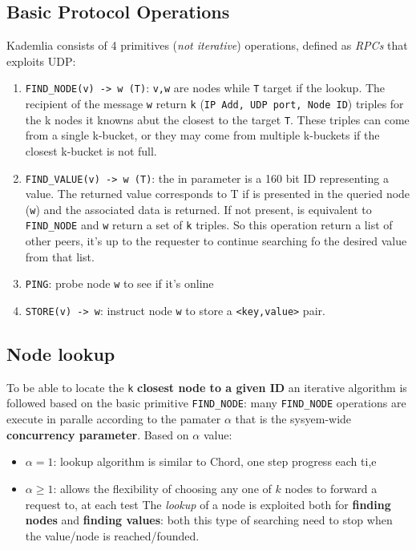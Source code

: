 \documentclass[10pt,a4paper]{report}
\begin{document}
\subsection{Basic Protocol Operations}\label{sec:basic-protocol-operations}
Kademlia consists of 4 primitives (\textit{not iterative}) operations, defined as \textit{RPCs} that exploits UDP:
\begin{enumerate}
	\item 
	\texttt{FIND\_NODE(v) -> w (T)}: \texttt{v,w} are nodes while \texttt{T} target if the lookup. The recipient of the message \texttt{w} return \texttt{k} (\texttt{IP Add, UDP port, Node ID}) triples for the k nodes it knowns abut the closest to the target \texttt{T}. These triples can come from a single k-bucket, or they may come from multiple k-buckets if the closest k-bucket is not full.
	\item 
	\texttt{FIND\_VALUE(v) -> w (T)}: the in parameter is a 160 bit ID representing a value. The returned value corresponds to T if is presented in the queried node (\texttt{w}) and the associated data is returned. If not present, is equivalent to \texttt{FIND\_NODE} and  \texttt{w} return a set of \texttt{k} triples. So this operation return a list of other peers, it's up to the requester to continue searching fo the desired value from that list.
	\item 
	\texttt{PING}: probe node \texttt{w} to see if it's online
	\item 
	\texttt{STORE(v) -> w}: instruct node \texttt{w} to store a \texttt{<key,value>} pair.
\end{enumerate}
\subsection{Node lookup}\label{sec:node-lookup}
To be able to locate the \texttt{k} \textbf{closest node to a given ID} an iterative algorithm is followed based on the basic primitive \texttt{FIND\_NODE}: many \texttt{FIND\_NODE} operations are execute in paralle according to the pamater $\alpha$ that is the sysyem-wide \textbf{concurrency parameter}. Based on $\alpha$ value:
\begin{itemize}
	\item 
	\textit{$\alpha = 1$}: lookup algorithm is similar to Chord, one step progress each ti,e
	\item 
	$\alpha \ge 1$: allows the flexibility of choosing any one of $k$ nodes to forward a request to, at each test
	The \textit{lookup} of a node is exploited both for \textbf{finding nodes} and \textbf{finding values}: both this type of searching need to stop when the value/node is reached/founded.
\end{itemize}
\end{document}

